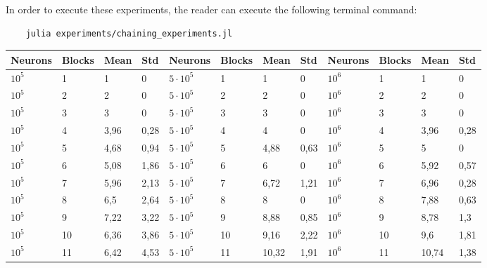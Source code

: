 \documentclass[letterpaper]{article}
\begin{document}
In order to execute these experiments, the reader can execute the following terminal command:
\begin{verbatim}
	julia experiments/chaining_experiments.jl
\end{verbatim}


\begin{table}[t]
\centering
\begin{tabular}{||l|l|l|l||l|l|l|l||l|l|l|l||}
\hline
\textbf{Neurons}     & \textbf{Blocks} & \textbf{Mean} & \textbf{Std}  & \textbf{Neurons}     & \textbf{Blocks} & \textbf{Mean} & \textbf{Std}  &  \textbf{Neurons}     & \textbf{Blocks} & \textbf{Mean} & \textbf{Std}    \\ \hline \hline
$10^5$ & 1             & 1    & 0    & $5 \cdot 10^5$ & 1             & 1     & 0     & $10^6$ & 1             & 1     & 0     \\ \hline
$10^5$ & 2             & 2    & 0    & $5 \cdot 10^5$ & 2             & 2     & 0     & $10^6$ & 2             & 2     & 0     \\ \hline
$10^5$ & 3             & 3    & 0    & $5 \cdot 10^5$ & 3             & 3     & 0     & $10^6$ & 3             & 3     & 0     \\ \hline
$10^5$ & 4             & 3,96 & 0,28 & $5 \cdot 10^5$ & 4             & 4     & 0     & $10^6$ & 4             & 3,96  & 0,28  \\ \hline
$10^5$ & 5             & 4,68 & 0,94 & $5 \cdot 10^5$ & 5             & 4,88  & 0,63  & $10^6$ & 5             & 5     & 0     \\ \hline
$10^5$ & 6             & 5,08 & 1,86 & $5 \cdot 10^5$ & 6             & 6     & 0     & $10^6$ & 6             & 5,92  & 0,57  \\ \hline
$10^5$ & 7             & 5,96 & 2,13 & $5 \cdot 10^5$ & 7             & 6,72  & 1,21  & $10^6$ & 7             & 6,96  & 0,28  \\ \hline
$10^5$ & 8             & 6,5  & 2,64 & $5 \cdot 10^5$ & 8             & 8     & 0     & $10^6$ & 8             & 7,88  & 0,63  \\ \hline
$10^5$ & 9             & 7,22 & 3,22 & $5 \cdot 10^5$ & 9             & 8,88  & 0,85  & $10^6$ & 9             & 8,78  & 1,3   \\ \hline
$10^5$ & 10            & 6,36 & 3,86 & $5 \cdot 10^5$ & 10            & 9,16  & 2,22  & $10^6$ & 10            & 9,6   & 1,81  \\ \hline
$10^5$ & 11            & 6,42 & 4,53 & $5 \cdot 10^5$ & 11            & 10,32 & 1,91  & $10^6$ & 11            & 10,74 & 1,38  \\ \hline

\end{tabular}
\end{table}
\end{document}
